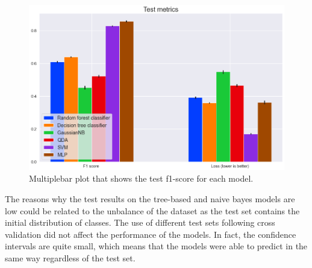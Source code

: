 \documentclass[../main]{subfiles}
\begin{document}
\begin{figure}[!ht]
    \center
    \includegraphics[width=0.8\linewidth]{figures/test_metric_plot.png}
    \caption{Multiplebar plot that shows the test f1-score for each model.}
    \label{fig:test_metric_plot}
\end{figure}
\newpage

The reasons why the test results on the tree-based and naive bayes models are low could be related to the unbalance of the dataset as the test set contains the initial distribution of classes.
The use of different test sets following cross validation did not affect the performance of the models.
In fact, the confidence intervals are quite small, which means that the models were able to predict in the same way regardless of the test set.
\end{document}
